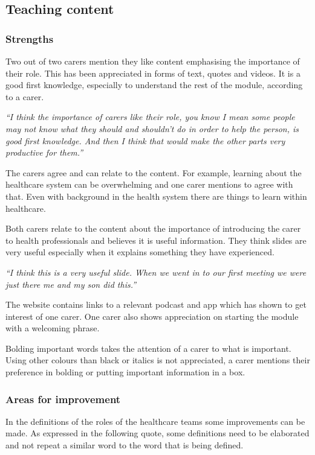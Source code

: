 \documentclass{sigchi}
\begin{document}
\subsection{Teaching content}
\subsubsection{Strengths}
Two out of two carers mention they like content emphasising the importance of their role. This has been appreciated in forms of text, quotes and videos. It is a good first knowledge, especially to understand the rest of the module, according to a carer.

\textit{“I think the importance of carers like their role, you know I mean some people may not know what they should and shouldn't do in order to help the person, is good first knowledge. And then I think that would make the other parts very productive for them.”}

The carers agree and can relate to the content. For example, learning about the healthcare system can be overwhelming and one carer mentions to agree with that. Even with background in the health system there are things to learn within healthcare.

Both carers relate to the content about the importance of introducing the carer to health professionals and believes it is useful information. They think slides are very useful especially when it explains something they have experienced.

\textit{“I think this is a very useful slide. When we went in to our first meeting we were just there me and my son did this.”}

The website contains links to a relevant podcast and app which has shown to get interest of one carer. One carer also shows appreciation on starting the module with a welcoming phrase.

Bolding important words takes the attention of a carer to what is important. Using other colours than black or italics is not appreciated, a carer mentions their preference in bolding or putting important information in a box.

\subsubsection{Areas for improvement}
In the definitions of the roles of the healthcare teams some improvements can be made. As expressed in the following quote, some definitions need to be elaborated and not repeat a similar word to the word that is being defined.
\end{document}

